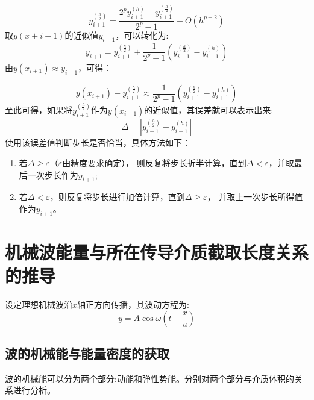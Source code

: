 \documentclass[lang=cn,a4paper,newtx]{elegantpaper}
\begin{document}
  \begin{equation}
    y_{i+1}^{(\frac{h}{2})}=\frac{2^py_{i+1}^{(h)}-y_{i+1}^{(\frac{h}{2})}}{2^p-1}+O(h^{p+2})
  \end{equation}
  取$ y(x+i+1)$的近似值$y_{i+1}$，可以转化为:
  \begin{equation}
    y_{i+1}=y_{i+1}^{(\frac{h}{2})}+\frac{1}{2^p-1}(y_{i+1}^{(\frac{h}{2})}-y_{i+1}^{(h)})
  \end{equation}
由$y(x_{i+1}) \approx y_{i+1}$，可得：

\begin{equation}
  y(x_{i+1})-y_{i+1}^{(\frac{h}{2})}\approx \frac{1}{2^p-1}(y_{i+1}^{(\frac{h}{2})}-y_{i+1}^{(h)})
\end{equation}
至此可得，如果将$y_{i+1}^{(\frac{h}{2})}$作为$y(x_{i+1})$的近似值，其误差就可以表示出来:
  \begin{equation}
    \Delta = |y_{i+1}^{(\frac{h}{2})}-y_{i+1}^{(h)}|    
  \end{equation}
使用该误差值判断步长是否恰当，具体方法如下：
  \begin{enumerate}
    \item 若$\Delta \geqslant \varepsilon$（$\varepsilon$由精度要求确定），
    则反复将步长折半计算，直到$\Delta <\varepsilon$，并取最后一次步长作为$y_{i+1}$;
    \item 若$\Delta < \varepsilon$，则反复将步长进行加倍计算，直到$\Delta \geqslant \varepsilon$，
    并取上一次步长所得值作为$y_{i+1}$。
  \end{enumerate}


\section{机械波能量与所在传导介质截取长度关系的推导}
  设定理想机械波沿$x$轴正方向传播，其波动方程为:
  \begin{equation}
    y=A \cos \omega(t-\frac{x}{u})
  \end{equation}

  \subsection{波的机械能与能量密度的获取}
    
  波的机械能可以分为两个部分:动能和弹性势能。分别对两个部分与介质体积的关系进行分析。
\end{document}
